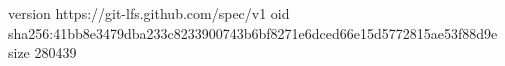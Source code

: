 version https://git-lfs.github.com/spec/v1
oid sha256:41bb8e3479dba233c8233900743b6bf8271e6dced66e15d5772815ae53f88d9e
size 280439
